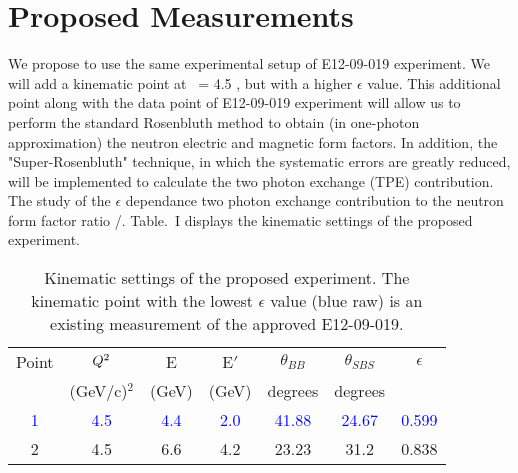 \section{Proposed Measurements} 
\label{prop}

We propose to use the same experimental setup of E12-09-019 experiment. We will add a kinematic point at \qsq~= 4.5 \gevcsq, but with a higher $\epsilon$ value. This additional point along with the data point of E12-09-019 experiment will allow us to perform the standard Rosenbluth method to obtain (in one-photon approximation) the neutron electric and magnetic form factors. In addition, the "Super-Rosenbluth" technique, in which the systematic errors are greatly reduced, will be implemented to calculate  the two photon exchange (TPE) contribution. The study of the $\epsilon$ dependance two photon exchange contribution to the neutron form factor ratio \gen/\gmn. Table.~I displays the kinematic settings of the proposed experiment. 

\begin{table}[h] 
\centering
\begin{tabular}{|c|c|c|c|c|c|c|}
\hline
\small{Point} & $Q\textsuperscript{2}$  & E & E$'$  & $\theta_{BB}$ & $\theta_{SBS}$ & $\epsilon$ \\
& (GeV/c)$^2$ & (GeV) & (GeV)  &\; degrees\; & \; degrees \;  &   \\
\hline
\textcolor{blue}
 1&\textcolor{blue} {4.5} & \textcolor{blue}{4.4} & \textcolor{blue}{2.0} & \textcolor{blue}{41.88}  & \textcolor{blue}{24.67} &\; \textcolor{blue}{0.599} \;\\
\hline
2 & 4.5  &  6.6  &  4.2  & 23.23  &  31.2  &  0.838 \\
\hline
\end{tabular} 
\caption{Kinematic settings of the proposed experiment. The kinematic point with the lowest $\epsilon$ value (blue raw) is an existing measurement of the approved  E12-09-019.}
\label{tab:propkin}
\end{table}

